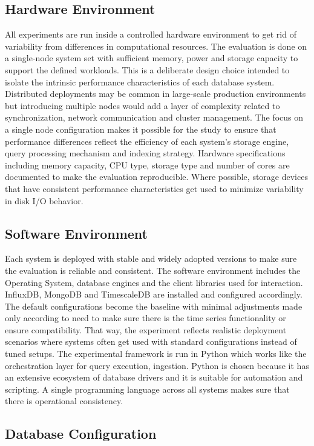 \subsection{Hardware Environment}
All experiments are run inside a controlled hardware environment to get rid of variability from differences in computational resources. The evaluation is done on a single-node system set with sufficient memory, power and storage capacity to support the defined workloads. This is a deliberate design choice intended to isolate the intrinsic performance characteristics of each database system. Distributed deployments may be common in large-scale production environments but introducing multiple nodes would add a layer of complexity related to synchronization, network communication and cluster management. The focus on a single node configuration makes it possible for the study to ensure that performance differences reflect the efficiency of each system’s storage engine, query processing mechanism and indexing strategy. Hardware specifications including memory capacity, CPU type, storage type and number of cores are documented to make the evaluation reproducible. Where possible, storage devices that have consistent performance characteristics get used to minimize variability in disk I/O behavior. 

\subsection{Software Environment}
Each system is deployed with stable and widely adopted versions to make sure the evaluation is reliable and consistent. The software environment includes the Operating System, database engines and the client libraries used for interaction. InfluxDB, MongoDB and TimescaleDB are installed and configured accordingly. The default configurations become the baseline with minimal adjustments made only according to need to make sure there is the time series functionality or ensure compatibility. That way, the experiment reflects realistic deployment scenarios where systems often get used with standard configurations instead of tuned setups. The experimental framework is run in Python which works like the orchestration layer for query execution, ingestion. Python is chosen because it has an extensive ecosystem of database drivers and it is suitable for automation and scripting. A single programming language across all systems makes sure that there is operational consistency. 


\subsection{Database Configuration}

